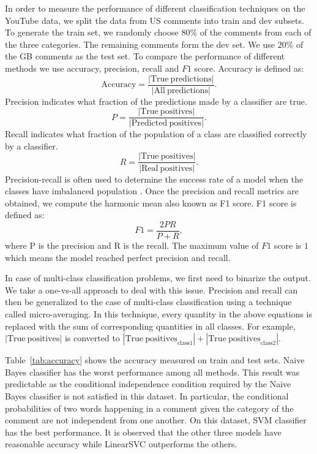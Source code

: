 In order to measure the performance of different classification techniques on the YouTube data, we split the data from US comments into train and dev subsets. To generate the train set, we randomly choose $80\%$ of the comments from each of the three categories. The remaining comments form the dev set. We use $20\%$ of the GB comments as the test set. 
To compare the performance of different methods we use accuracy, precision, recall and $F1$ score. 
Accuracy is defined as:
\begin{equation*}
\mathrm{Accuracy} = \frac{\left|\mathrm{True\:predictions}\right|}{\left|\mathrm{All\:predictions}\right|}.
\end{equation*}
Precision indicates what fraction of the predictions made by a classifier are true.
\begin{equation*}
P = \frac{\left|\mathrm{True\:positives}\right|}{\left|\mathrm{Predicted\:positives}\right|}.
\end{equation*}
Recall indicates what fraction of the population of a class are classified correctly by a classifier.
\begin{equation*}
R = \frac{\left|\mathrm{True\:positives}\right|}{\left|\mathrm{Real\:positives}\right|}.
\end{equation*}
Precision-recall is often used to determine the success rate of a model when the classes have imbalanced population .  
Once the precision and recall metrics are obtained, we compute the harmonic mean also known as F1 score. F1 score is defined as:
\begin{equation*}
F1 = \frac{2PR}{P + R},
\end{equation*}
where P is the precision and R is the recall. The maximum value of $F1$ score is $1$ which means the model reached perfect precision and recall.

In case of multi-class classification problems, we first need to binarize the output. 
We take a one-vs-all approach to deal with this issue. Precision and recall can then be generalized to the case of multi-class classification using a technique called micro-averaging. In this technique, every quantity in the above equations is replaced with the sum of corresponding quantities in all classes. For example, $\left|\mathrm{True\:positives}\right|$ is converted to $\left|\mathrm{True\:positives}_{\mathrm{class1}}\right| + \left|\mathrm{True\:positives}_{\mathrm{class2}}\right|$.

Table~\ref{tab:accuracy} shows the accuracy measured on train and test sets. Naive Bayes classifier has the worst performance among all methods. This result was predictable as the conditional independence condition required by the Naive Bayes classifier is not satisfied in this dataset. In particular, the conditional probabilities of two words happening in a comment given the category of the comment are not independent from one another. On this dataset, SVM classifier has the best performance. It is observed that the other three models have reasonable accuracy while LinearSVC outperforms the others. 

